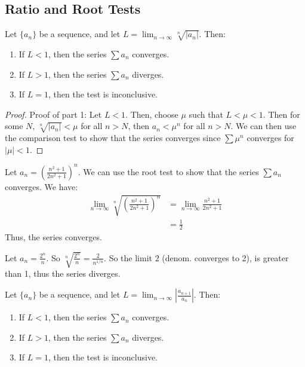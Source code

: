 \documentclass[11pt]{report}
\begin{document}
\subsection{Ratio and Root Tests}
\begin{theorem}
    Let $\{a_n\}$ be a sequence, and let $L = \lim_{n \to \infty} \sqrt[n]{|a_n|}$. Then:
    \begin{enumerate}
        \item If $L < 1$, then the series $\sum a_n$ converges.
        \item If $L > 1$, then the series $\sum a_n$ diverges.
        \item If $L = 1$, then the test is inconclusive.
    \end{enumerate}
\end{theorem}
\begin{proof}
    Proof of part 1: Let $L < 1$. Then, choose $\mu$ such that $L < \mu < 1$. Then for some $N$, $\sqrt[n]{|a_n|} < \mu$ for all $n > N$, then $a_n < \mu^n$ for all $n > N$. We can then use the comparison test to show that the series converges since $\sum \mu^n$ converges for $|\mu| < 1$.
\end{proof}
\begin{example}
    Let $a_n = \left ( \frac{n^2 + 1}{2n^2 + 1} \right )^n$. We can use the root test to show that the series $\sum a_n$ converges. We have:
    \begin{align*}
        \lim_{n \to \infty} \sqrt[n]{\left ( \frac{n^2 + 1}{2n^2 + 1} \right )^n} &= \lim_{n \to \infty} \frac{n^2 + 1}{2n^2 + 1} \\
        &= \frac{1}{2}
    \end{align*}
    Thus, the series converges.
\end{example}
\begin{example}
    Let $a_n = \frac{2^n}{n}$. So $\sqrt[n]{\frac{2^n}{n}} = \frac{2}{n^{1/n}}$. So the limit $2$ (denom. converges to 2), is greater than 1, thus the series diverges.
\end{example}
\begin{theorem}
    Let $\{a_n\}$ be a sequence, and let $L = \lim_{n \to \infty} \left | \frac{a_{n+1}}{a_n} \right |$. Then:
    \begin{enumerate}
        \item If $L < 1$, then the series $\sum a_n$ converges.
        \item If $L > 1$, then the series $\sum a_n$ diverges.
        \item If $L = 1$, then the test is inconclusive.
    \end{enumerate}
\end{theorem}
\end{document}
